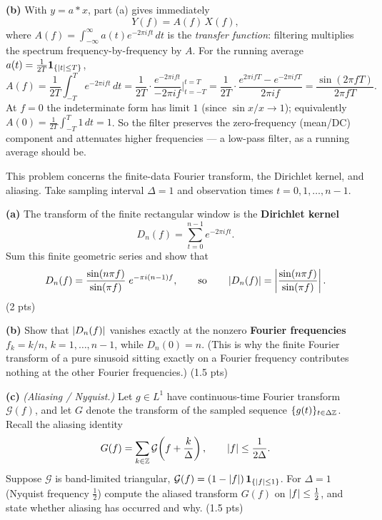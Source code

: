 \documentclass[11pt]{article}
\begin{document}
\textbf{(b)} With $y=a*x$, part (a) gives immediately
\[
Y(f)=A(f)\,X(f),
\]
where $A(f)=\int_{-\infty}^{\infty} a(t)e^{-2\pi i f t}\,dt$ is the \emph{transfer function}: filtering multiplies the spectrum frequency-by-frequency by $A$. For the running average $a(t)=\tfrac1{2T}\mathbf{1}_{\{\left\lvert t \right\rvert\le T\}}$,
\[
A(f)=\frac{1}{2T}\int_{-T}^{T} e^{-2\pi i f t}\,dt
=\frac{1}{2T}\cdot\frac{e^{-2\pi i f t}}{-2\pi i f}\Bigg|_{t=-T}^{t=T}
=\frac{1}{2T}\cdot\frac{e^{2\pi i f T}-e^{-2\pi i f T}}{2\pi i f}
=\frac{\sin(2\pi f T)}{2\pi f T}.
\]
At $f=0$ the indeterminate form has limit $1$ (since $\sin x/x\to1$); equivalently $A(0)=\frac{1}{2T}\int_{-T}^{T}1\,dt=1$. So the filter preserves the zero-frequency (mean/DC) component and attenuates higher frequencies --- a low-pass filter, as a running average should be.

\statementstart
This problem concerns the finite-data Fourier transform, the Dirichlet kernel, and aliasing. Take sampling interval $\Delta=1$ and observation times $t=0,1,\dots,n-1$.

\textbf{(a)} The transform of the finite rectangular window is the \textbf{Dirichlet kernel}
\[
D_n(f)=\sum_{t=0}^{n-1} e^{-2\pi i f t}.
\]
Sum this finite geometric series and show that
\[
D_n(f)=\frac{\sin(n\pi f)}{\sin(\pi f)}\;e^{-\pi i (n-1) f},
\qquad\text{so}\qquad
\left\lvert D_n(f) \right\rvert=\left\lvert\frac{\sin(n\pi f)}{\sin(\pi f)}\right\rvert .
\]
\hfill(2 pts)

\textbf{(b)} Show that $\left\lvert D_n(f) \right\rvert$ vanishes exactly at the nonzero \textbf{Fourier frequencies} $f_k=k/n$, $k=1,\dots,n-1$, while $D_n(0)=n$. (This is why the finite Fourier transform of a pure sinusoid sitting exactly on a Fourier frequency contributes nothing at the other Fourier frequencies.) \hfill(1.5 pts)

\textbf{(c)} \emph{(Aliasing / Nyquist.)} Let $g\in L^1$ have continuous-time Fourier transform $\mathcal G(f)$, and let $G$ denote the transform of the sampled sequence $\{g(t)\}_{t\in\Delta\mathbb{Z}}$. Recall the aliasing identity
\[
G(f)=\sum_{k\in\mathbb{Z}}\mathcal G\!\left(f+\frac{k}{\Delta}\right),
\qquad \left\lvert f \right\rvert\le \frac{1}{2\Delta}.
\]
Suppose $\mathcal G$ is band-limited triangular,
$\mathcal G(f)=(1-\left\lvert f \right\rvert)\,\mathbf{1}_{\{\left\lvert f \right\rvert\le 1\}}$.
For $\Delta=1$ (Nyquist frequency $\tfrac12$) compute the aliased transform $G(f)$ on $\left\lvert f \right\rvert\le\tfrac12$, and state whether aliasing has occurred and why. \hfill(1.5 pts)
\statementend
\end{document}
